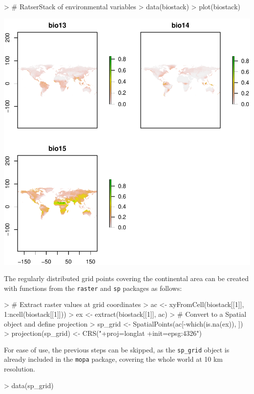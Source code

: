 \documentclass[10pt,a4paper]{article}
\begin{document}
\begin{Schunk}
\begin{Sinput}
> # RatserStack of environmental variables
> data(biostack)
> plot(biostack)
\end{Sinput}
\end{Schunk}
\includegraphics{mopa-mopa3}

The regularly distributed grid points covering the continental area can be created with functions from the \texttt{raster} and \texttt{sp} packages as follows:

\begin{Schunk}
\begin{Sinput}
> # Extract raster values at grid coordinates
> ac <- xyFromCell(biostack[[1]], 1:ncell(biostack[[1]]))
> ex <- extract(biostack[[1]], ac)
> # Convert to a Spatial object and define projection
> sp_grid <- SpatialPoints(ac[-which(is.na(ex)), ])
> projection(sp_grid) <- CRS("+proj=longlat +init=epsg:4326")
\end{Sinput}
\end{Schunk}

For ease of use, the previous steps can be skipped, as the \texttt{sp\_grid} object is already included in the \texttt{mopa} package, covering the whole world at 10 km resolution.

\begin{Schunk}
\begin{Sinput}
> data(sp_grid)
\end{Sinput}
\end{Schunk}
\end{document}
